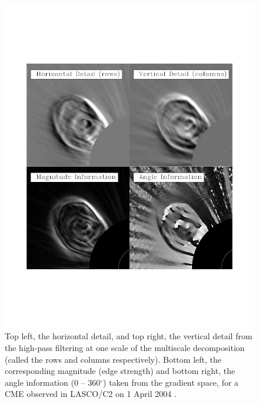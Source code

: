\documentclass[namedreferences]{SolarPhysics}
\begin{document}
\begin{article}
\begin{figure}[!ht]
\centerline{\includegraphics[scale=0.8, clip=true, trim=0 130 0 150]{images/canny_images.pdf}}
\caption{Top left, the horizontal detail, and top right, the vertical detail from the high-pass filtering at one scale of the multiscale decomposition (called the rows and columns respectively). Bottom left, the corresponding magnitude (edge strength) and bottom right, the angle information (0 -- 360$^{\circ}$) taken from the gradient space, for a CME observed in LASCO/C2 on 1 April 2004 \citep{2009A&A...495..325B}.}
\label{decomp}
\end{figure}


\end{article}
\end{document}
